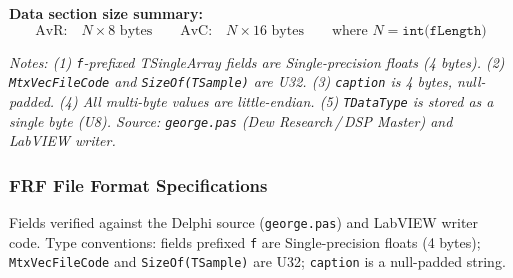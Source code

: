 \documentclass[11pt, oneside]{article}   	%
\begin{document}
\vspace{1em}
\noindent\small\textbf{Data section size summary:}
\[
\text{AvR:}\quad N \times 8 \text{ bytes} \qquad \text{AvC:}\quad N \times 16 \text{ bytes} \qquad \text{where } N = \texttt{int(fLength)}
\]
 
\vspace{0.5em}
\noindent\small\textit{%
Notes: (1) \texttt{f}-prefixed TSingleArray fields are Single-precision floats (4 bytes).
(2) \texttt{MtxVecFileCode} and \texttt{SizeOf(TSample)} are U32.
(3) \texttt{caption} is 4 bytes, null-padded.
(4) All multi-byte values are little-endian.
(5) \texttt{TDataType} is stored as a single byte (U8).
Source: \texttt{george.pas} (Dew Research\,/\,DSP Master) and LabVIEW writer.}


\subsubsection{FRF File Format Specifications}
\noindent Fields verified against the Delphi source (\texttt{george.pas}) and LabVIEW writer code.
Type conventions: fields prefixed \texttt{f} are Single-precision floats (4 bytes);
\texttt{MtxVecFileCode} and \texttt{SizeOf(TSample)} are U32; \texttt{caption} is a null-padded string.
 
\vspace{0.5em}
 
\end{document}
